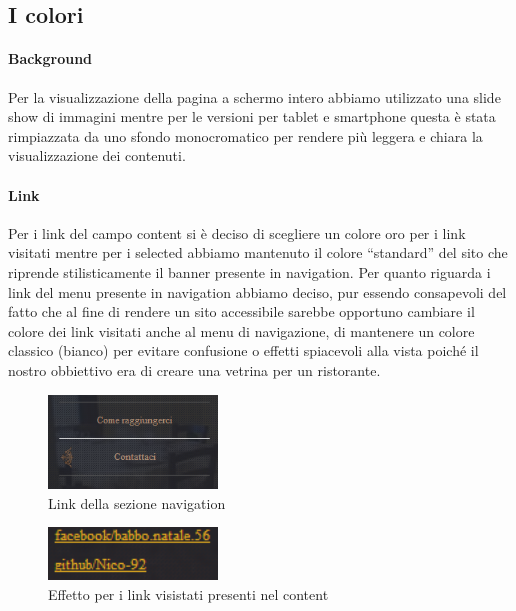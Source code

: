\subsection{I colori}

\paragraph{Background}

Per la visualizzazione della pagina a schermo intero abbiamo utilizzato una slide show di immagini mentre per le versioni per tablet e smartphone questa è stata rimpiazzata da uno sfondo monocromatico per rendere più leggera e chiara la visualizzazione dei contenuti.

\paragraph{Link}

Per i link del campo content si è deciso di scegliere un colore oro per i link visitati mentre per i selected abbiamo mantenuto il colore “standard” del sito che riprende stilisticamente il banner presente in navigation. Per quanto riguarda i link del menu presente in navigation abbiamo deciso, pur essendo consapevoli del fatto che al fine di rendere un sito accessibile sarebbe opportuno cambiare il colore dei link visitati anche al menu di navigazione, di mantenere un colore classico (bianco) per evitare confusione o effetti spiacevoli alla vista poiché il nostro obbiettivo era di creare una vetrina per un ristorante. 

\begin{figure}[H]
		\centering \includegraphics[width=0.4\textwidth]{images/link-navigation.png}
		\caption{Link della sezione navigation}
\end{figure}

\begin{figure}[H]
		\centering \includegraphics[width=0.4\textwidth]{images/link-content.png}
		\caption{Effetto per i link visistati presenti nel content}
\end{figure}

